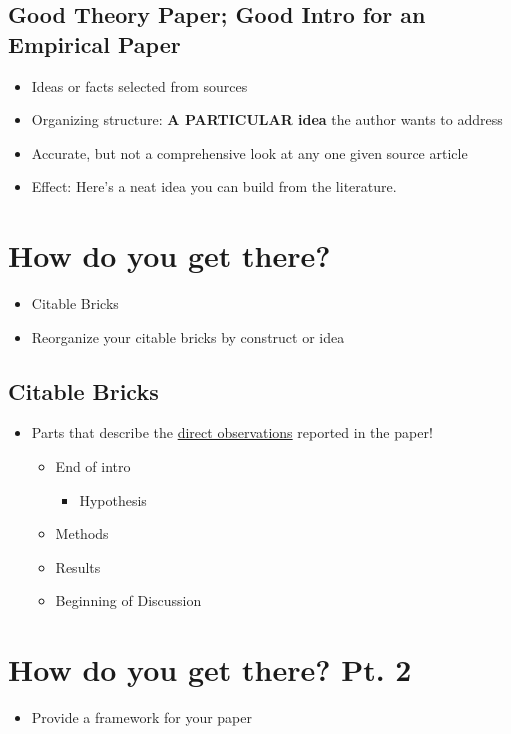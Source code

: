 \documentclass{report}
\begin{document}
\subsection{Good Theory Paper; Good Intro for an Empirical Paper}
\begin{itemize}
    \item Ideas or facts selected from sources 
    \item Organizing structure: \textbf{A PARTICULAR idea} the author wants to address
    \item Accurate, but not a comprehensive look at any one given source article
    \item Effect: Here's a neat idea you can build from the literature.
\end{itemize}

\vspace{10pt}

\section{How do you get there?}
\begin{itemize}
    \item Citable Bricks
    \item Reorganize your citable bricks by construct or idea
\end{itemize}

\subsection{Citable Bricks}
\begin{itemize}
    \item Parts that describe the \underline{direct observations} reported in the paper! 
    \begin{itemize}
        \item End of intro
        \begin{itemize}
            \item Hypothesis
        \end{itemize}
        \item Methods
        \item Results
        \item Beginning of Discussion
    \end{itemize}
\end{itemize}

\vspace{10pt}

\section{How do you get there? Pt. 2}
\begin{itemize}
    \item Provide a framework for your paper
\end{itemize}
\end{document}
